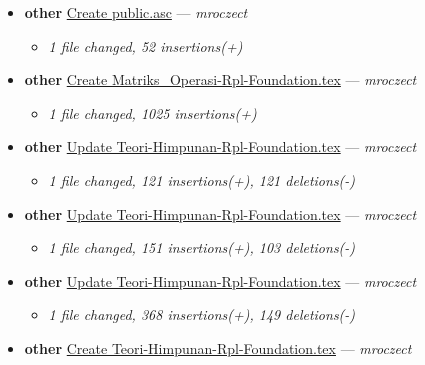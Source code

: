 \begin{itemize}[leftmargin=1.5em]
\begin{itemize}[leftmargin=1.5em]
  \end{itemize}
  \item \textbf{other} \href{https://github.com/mroczect/mroczect.github.io/commit/3579484fa9fbf8eb418b75a06d1c5eff950895b9}{Create public.asc} --- \textit{mroczect}
  \begin{itemize}[leftmargin=1.5em]
    \item \small\textit{1 file changed, 52 insertions(+)}
  \end{itemize}
  \item \textbf{other} \href{https://github.com/mroczect/mroczect.github.io/commit/de49f0c64e829697ffe42d78151736729a13df69}{Create Matriks\_Operasi-Rpl-Foundation.tex} --- \textit{mroczect}
  \begin{itemize}[leftmargin=1.5em]
    \item \small\textit{1 file changed, 1025 insertions(+)}
  \end{itemize}
  \item \textbf{other} \href{https://github.com/mroczect/mroczect.github.io/commit/09e14e8ab5836f1720b61660f21adb269a170228}{Update Teori-Himpunan-Rpl-Foundation.tex} --- \textit{mroczect}
  \begin{itemize}[leftmargin=1.5em]
    \item \small\textit{1 file changed, 121 insertions(+), 121 deletions(-)}
  \end{itemize}
  \item \textbf{other} \href{https://github.com/mroczect/mroczect.github.io/commit/c2a6ac3f67d82927efac359770e8070e7be89806}{Update Teori-Himpunan-Rpl-Foundation.tex} --- \textit{mroczect}
  \begin{itemize}[leftmargin=1.5em]
    \item \small\textit{1 file changed, 151 insertions(+), 103 deletions(-)}
  \end{itemize}
  \item \textbf{other} \href{https://github.com/mroczect/mroczect.github.io/commit/b17993735ff0638aa4fb4adea538379e225bd7be}{Update Teori-Himpunan-Rpl-Foundation.tex} --- \textit{mroczect}
  \begin{itemize}[leftmargin=1.5em]
    \item \small\textit{1 file changed, 368 insertions(+), 149 deletions(-)}
  \end{itemize}
  \item \textbf{other} \href{https://github.com/mroczect/mroczect.github.io/commit/7c72a90d61f5d253eace6a1a298e86a651856c1b}{Create Teori-Himpunan-Rpl-Foundation.tex} --- \textit{mroczect}

\end{itemize}

